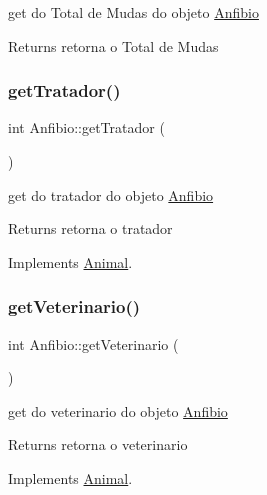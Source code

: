 get do Total de Mudas do objeto \mbox{\hyperlink{class_anfibio}{Anfibio}} 

\begin{DoxyReturn}{Returns}
retorna o Total de Mudas 
\end{DoxyReturn}
\mbox{\label{class_anfibio_a7906eb56c2fd2d1c61b010f40f0c15be}} 
\subsubsection{\texorpdfstring{getTratador()}{getTratador()}}
{\footnotesize\ttfamily int Anfibio\+::get\+Tratador (\begin{DoxyParamCaption}{ }\end{DoxyParamCaption})\hspace{0.3cm}{\ttfamily [virtual]}}



get do tratador do objeto \mbox{\hyperlink{class_anfibio}{Anfibio}} 

\begin{DoxyReturn}{Returns}
retorna o tratador 
\end{DoxyReturn}


Implements \mbox{\hyperlink{class_animal}{Animal}}.

\mbox{\label{class_anfibio_a427cc12c850b4e8b6ef09a080617c943}} 
\subsubsection{\texorpdfstring{getVeterinario()}{getVeterinario()}}
{\footnotesize\ttfamily int Anfibio\+::get\+Veterinario (\begin{DoxyParamCaption}{ }\end{DoxyParamCaption})\hspace{0.3cm}{\ttfamily [virtual]}}



get do veterinario do objeto \mbox{\hyperlink{class_anfibio}{Anfibio}} 

\begin{DoxyReturn}{Returns}
retorna o veterinario 
\end{DoxyReturn}


Implements \mbox{\hyperlink{class_animal}{Animal}}.

